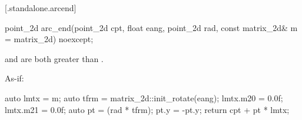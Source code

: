  [\iotwod.standalone.arcend] {}

%
\begin{itemdecl}
point_2d arc_end(point_2d cpt, float eang, point_2d rad, 
  const matrix_2d& m = matrix_2d{}) noexcept;
\end{itemdecl}
\begin{itemdescr}
\pnum
\requires
{} and  are both greater than .

\pnum
\returns
As-if:
\begin{codeblock}
auto lmtx = m;
auto tfrm = matrix_2d::init_rotate(eang);
lmtx.m20 = 0.0f; lmtx.m21 = 0.0f;
auto pt = (rad * tfrm);
pt.y = -pt.y;
return cpt + pt * lmtx;
\end{codeblock}
\end{itemdescr}
